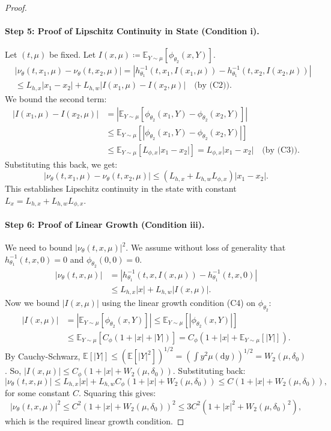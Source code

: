 \documentclass[qian]{imsart}
\newcommand{\E}{\mathbb{E}}
\newcommand{\dd}{\mathrm{d}}
\theoremstyle{plain}
\theoremstyle{definition}
\begin{document}
\begin{proof}
\paragraph{Step 5: Proof of Lipschitz Continuity in State (Condition i).}
Let $(t,\mu)$ be fixed. Let $I(x,\mu) \coloneqq \mathbb{E}_{Y \sim \mu}[\phi_{\theta_2}(x, Y)]$.
\begin{align*}
    &|\nu_\theta(t, x_1, \mu) - \nu_\theta(t, x_2, \mu)| = |h_{\theta_1}^{-1}(t,x_1,I(x_1,\mu)) - h_{\theta_1}^{-1}(t,x_2,I(x_2,\mu))| \\
    &\le L_{h,x}|x_1-x_2| + L_{h,w}|I(x_1,\mu) - I(x_2,\mu)| \quad \text{(by (C2))}.
\end{align*}
We bound the second term:
\begin{align*}
    |I(x_1,\mu) - I(x_2,\mu)| &= |\E_{Y \sim \mu}[\phi_{\theta_2}(x_1, Y) - \phi_{\theta_2}(x_2, Y)]| \\
    &\le \E_{Y \sim \mu}[|\phi_{\theta_2}(x_1, Y) - \phi_{\theta_2}(x_2, Y)|] \\
    &\le \E_{Y \sim \mu}[L_{\phi,x}|x_1 - x_2|] = L_{\phi,x}|x_1 - x_2| \quad \text{(by (C3))}.
\end{align*}
Substituting this back, we get:
\[ |\nu_\theta(t, x_1, \mu) - \nu_\theta(t, x_2, \mu)| \le (L_{h,x} + L_{h,w}L_{\phi,x})|x_1-x_2|. \]
This establishes Lipschitz continuity in the state with constant $L_x = L_{h,x} + L_{h,w}L_{\phi,x}$.

\paragraph{Step 6: Proof of Linear Growth (Condition iii).}
We need to bound $|\nu_\theta(t,x,\mu)|^2$. We assume without loss of generality that $h_{\theta_1}^{-1}(t,x,0)=0$ and $\phi_{\theta_2}(0,0)=0$.
\begin{align*}
    |\nu_\theta(t,x,\mu)| &= |h_{\theta_1}^{-1}(t,x,I(x,\mu)) - h_{\theta_1}^{-1}(t,x,0)| \\
    &\le L_{h,x}|x| + L_{h,w}|I(x,\mu)|.
\end{align*}
Now we bound $|I(x,\mu)|$ using the linear growth condition (C4) on $\phi_{\theta_2}$:
\begin{align*}
|I(x,\mu)| &= |\E_{Y \sim \mu}[\phi_{\theta_2}(x,Y)]| \le \E_{Y \sim \mu}[|\phi_{\theta_2}(x,Y)|] \\
&\le \E_{Y \sim \mu}[C_\phi(1+|x|+|Y|)] = C_\phi(1+|x|+\E_{Y \sim \mu}[|Y|]).
\end{align*}
By Cauchy-Schwarz, $\E[|Y|] \le (\E[|Y|^2])^{1/2} = (\int y^2 \mu(\dd y))^{1/2} = W_2(\mu,\delta_0)$.
So, $|I(x,\mu)| \le C_\phi(1+|x|+W_2(\mu,\delta_0))$. Substituting back:
\[ |\nu_\theta(t,x,\mu)| \le L_{h,x}|x| + L_{h,w}C_\phi(1+|x|+W_2(\mu,\delta_0)) \le C(1+|x|+W_2(\mu,\delta_0)), \]
for some constant $C$. Squaring this gives:
\[ |\nu_\theta(t,x,\mu)|^2 \le C^2(1+|x|+W_2(\mu,\delta_0))^2 \le 3C^2(1+|x|^2+W_2(\mu,\delta_0)^2), \]
which is the required linear growth condition.


\end{proof}
\end{document}

